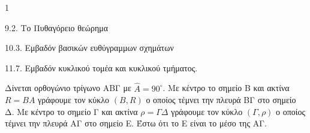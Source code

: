 \begin{ylh}{1}
    \item 9.2. Το Πυθαγόρειο θεώρημα
    \item 10.3. Εμβαδόν βασικών ευθύγραμμων σχημάτων
    \item 11.7. Εμβαδόν κυκλικού τομέα και κυκλικού τμήματος.
\end{ylh}
\begin{figure}
    \centering
\end{figure}
Δίνεται ορθογώνιο τρίγωνο ΑΒΓ με $\hat{Α} = 90^\circ$. Με κέντρο το σημείο Β και ακτίνα $R = ΒΑ$ γράφουμε τον κύκλο $(Β, R)$ ο οποίος τέμνει την πλευρά ΒΓ στο σημείο Δ. Με κέντρο το σημείο Γ και ακτίνα $\rho = ΓΔ$ γράφουμε τον κύκλο $(\Gamma, \rho)$ ο οποίος τέμνει την πλευρά ΑΓ στο σημείο Ε. Έστω ότι το Ε είναι το μέσο της ΑΓ.
